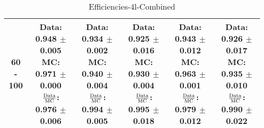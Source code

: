 \documentclass[final,letterpaper,twoside,12pt]{article}
\begin{document}
\begin{table}[htbp]
\begin{adjustwidth}{-4em}{-4em}
\begin{tabular}{|c|c|c|c|c|c|}
60 - 100 & \parbox[c]{1.1 in}{ \scriptsize  Data: 0.948 $\pm$ 0.005 \newline MC: 0.971 $\pm$ 0.000 \newline $\frac{\rm{Data}}{\rm{MC}}$: 0.976 $\pm$ 0.006} & \parbox[c]{1.1 in}{ \scriptsize  Data: 0.934 $\pm$ 0.002 \newline MC: 0.940 $\pm$ 0.004 \newline $\frac{\rm{Data}}{\rm{MC}}$: 0.994 $\pm$ 0.005} & \parbox[c]{1.1 in}{ \scriptsize  Data: 0.925 $\pm$ 0.016 \newline MC: 0.930 $\pm$ 0.004 \newline $\frac{\rm{Data}}{\rm{MC}}$: 0.995 $\pm$ 0.018} & \parbox[c]{1.1 in}{ \scriptsize  Data: 0.943 $\pm$ 0.012 \newline MC: 0.963 $\pm$ 0.001 \newline $\frac{\rm{Data}}{\rm{MC}}$: 0.979 $\pm$ 0.012} & \parbox[c]{1.1 in}{ \scriptsize  Data: 0.926 $\pm$ 0.017 \newline MC: 0.935 $\pm$ 0.010 \newline $\frac{\rm{Data}}{\rm{MC}}$: 0.990 $\pm$ 0.022}\\ \hline 
\end{tabular}
\caption {Efficiencies-4l-Combined}
\label{tab:cqdata0}
\end{adjustwidth}\end{table}
\end{document}
